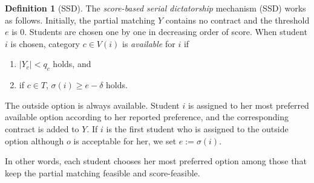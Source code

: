 \documentclass[a4paper,twoside]{article}
\theoremstyle{definition}
\newtheorem{definition}{Definition}
\begin{document}
\begin{definition}[SSD]
\label{def:ssd}
The \emph{score-based serial dictatorship} mechanism (SSD) works as follows.
Initially, the partial matching $Y$ contains no contract and the threshold $e$ is $0$.
Students are chosen one by one in decreasing order of score.
When student $i$ is chosen, category $c\in V(i)$ is \emph{available} for $i$ if
\begin{enumerate}
\item $|Y_c|<q_c$ holds, and
\item if $c\in T$, $\sigma(i)\ge e-\delta$ holds.
\end{enumerate}
The outside option is always available.
Student $i$ is assigned to her most preferred available option according to her reported
preference, and the corresponding contract is added to $Y$.
If $i$ is the first student who is assigned to the outside option although $o$ is
acceptable for her, we set $e:=\sigma(i)$.
\end{definition}

In other words, each student chooses her most preferred option among those that keep
the partial matching feasible and score-feasible.
\end{document}
